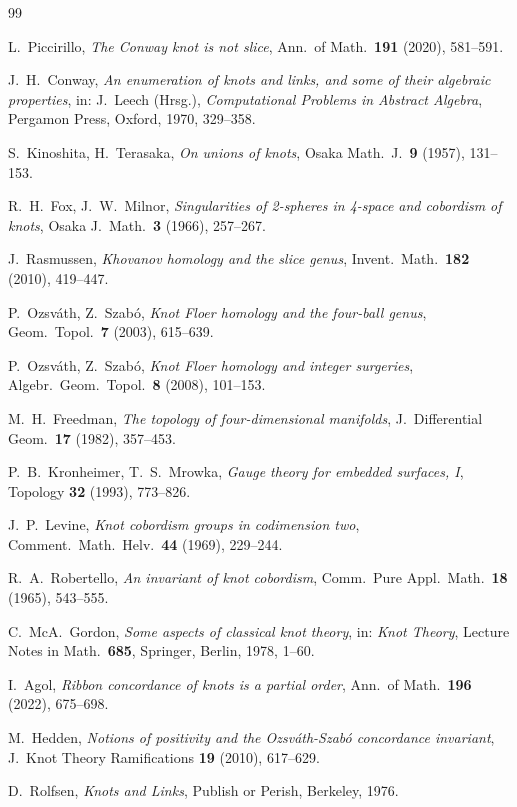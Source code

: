 \documentclass[12pt,a4paper]{amsart}
\theoremstyle{definition}
\theoremstyle{remark}
\begin{document}
\begin{thebibliography}{99}

L.~Piccirillo,
\textit{The Conway knot is not slice},
Ann.\ of Math.\ \textbf{191} (2020), 581--591.

J.~H.~Conway,
\textit{An enumeration of knots and links, and some of their algebraic
properties},
in: J.~Leech (Hrsg.), \textit{Computational Problems in Abstract Algebra},
Pergamon Press, Oxford, 1970, 329--358.

S.~Kinoshita, H.~Terasaka,
\textit{On unions of knots},
Osaka Math.\ J.\ \textbf{9} (1957), 131--153.

R.~H.~Fox, J.~W.~Milnor,
\textit{Singularities of 2-spheres in 4-space and cobordism of knots},
Osaka J.\ Math.\ \textbf{3} (1966), 257--267.

J.~Rasmussen,
\textit{Khovanov homology and the slice genus},
Invent.\ Math.\ \textbf{182} (2010), 419--447.

P.~Ozsváth, Z.~Szabó,
\textit{Knot Floer homology and the four-ball genus},
Geom.\ Topol.\ \textbf{7} (2003), 615--639.

P.~Ozsváth, Z.~Szabó,
\textit{Knot Floer homology and integer surgeries},
Algebr.\ Geom.\ Topol.\ \textbf{8} (2008), 101--153.

M.~H.~Freedman,
\textit{The topology of four-dimensional manifolds},
J.\ Differential Geom.\ \textbf{17} (1982), 357--453.

P.~B.~Kronheimer, T.~S.~Mrowka,
\textit{Gauge theory for embedded surfaces, I},
Topology \textbf{32} (1993), 773--826.

J.~P.~Levine,
\textit{Knot cobordism groups in codimension two},
Comment.\ Math.\ Helv.\ \textbf{44} (1969), 229--244.

R.~A.~Robertello,
\textit{An invariant of knot cobordism},
Comm.\ Pure Appl.\ Math.\ \textbf{18} (1965), 543--555.

C.~McA.~Gordon,
\textit{Some aspects of classical knot theory},
in: \textit{Knot Theory}, Lecture Notes in Math.\ \textbf{685},
Springer, Berlin, 1978, 1--60.

I.~Agol,
\textit{Ribbon concordance of knots is a partial order},
Ann.\ of Math.\ \textbf{196} (2022), 675--698.

M.~Hedden,
\textit{Notions of positivity and the Ozsváth-Szabó concordance invariant},
J.\ Knot Theory Ramifications \textbf{19} (2010), 617--629.

D.~Rolfsen,
\textit{Knots and Links},
Publish or Perish, Berkeley, 1976.

\end{thebibliography}
\end{document}
